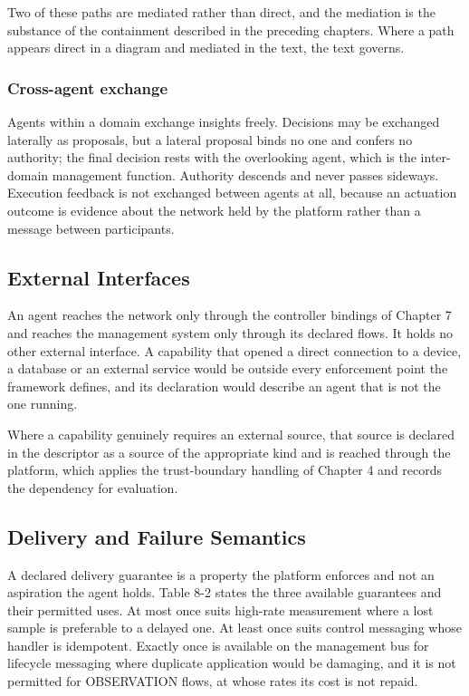 Two of these paths are mediated rather than direct, and the mediation is
the substance of the containment described in the preceding chapters.
Where a path appears direct in a diagram and mediated in the text, the
text governs.

\hypertarget{cross-agent-exchange}{%
\subsubsection{Cross-agent exchange}\label{cross-agent-exchange}}

Agents within a domain exchange insights freely. Decisions may be
exchanged laterally as proposals, but a lateral proposal binds no one
and confers no authority; the final decision rests with the overlooking
agent, which is the inter-domain management function. Authority descends
and never passes sideways. Execution feedback is not exchanged between
agents at all, because an actuation outcome is evidence about the
network held by the platform rather than a message between participants.

\hypertarget{external-interfaces}{%
\subsection{External Interfaces}\label{external-interfaces}}

An agent reaches the network only through the controller bindings of
Chapter 7 and reaches the management system only through its declared
flows. It holds no other external interface. A capability that opened a
direct connection to a device, a database or an external service would
be outside every enforcement point the framework defines, and its
declaration would describe an agent that is not the one running.

Where a capability genuinely requires an external source, that source is
declared in the descriptor as a source of the appropriate kind and is
reached through the platform, which applies the trust-boundary handling
of Chapter 4 and records the dependency for evaluation.

\hypertarget{delivery-and-failure-semantics}{%
\subsection{Delivery and Failure Semantics}\label{delivery-and-failure-semantics}}

A declared delivery guarantee is a property the platform enforces and
not an aspiration the agent holds. Table 8-2 states the three available
guarantees and their permitted uses. At most once suits high-rate
measurement where a lost sample is preferable to a delayed one. At least
once suits control messaging whose handler is idempotent. Exactly once
is available on the management bus for lifecycle messaging where
duplicate application would be damaging, and it is not permitted for
OBSERVATION flows, at whose rates its cost is not repaid.

